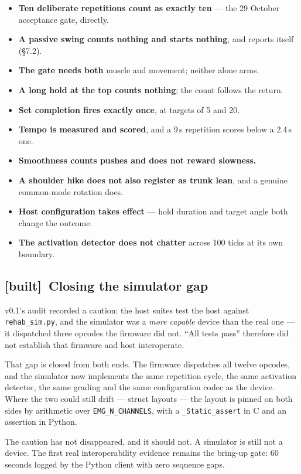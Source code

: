 \documentclass[11pt]{article}
\newcommand{\built}{{\sffamily\scriptsize\color{good}\textbf{[built]}}\ }
\begin{document}
\begin{itemize}
\item \textbf{Ten deliberate repetitions count as exactly ten} --- the
29 October acceptance gate, directly.
\item \textbf{A passive swing counts nothing and starts nothing}, and reports
itself (\S7.2).
\item \textbf{The gate needs both} muscle and movement; neither alone arms.
\item \textbf{A long hold at the top counts nothing}; the count follows the
return.
\item \textbf{Set completion fires exactly once}, at targets of 5 and 20.
\item \textbf{Tempo is measured and scored}, and a 9\,s repetition scores
below a 2.4\,s one.
\item \textbf{Smoothness counts pushes and does not reward slowness.}
\item \textbf{A shoulder hike does not also register as trunk lean}, and a
genuine common-mode rotation does.
\item \textbf{Host configuration takes effect} --- hold duration and target
angle both change the outcome.
\item \textbf{The activation detector does not chatter} across 100 ticks at
its own boundary.
\end{itemize}

\subsection{\built Closing the simulator gap}

\begin{callout}
v0.1's audit recorded a caution: the host suites test the host against
\texttt{rehab\_sim.py}, and the simulator was a \emph{more capable} device
than the real one --- it dispatched three opcodes the firmware did not. ``All
tests pass'' therefore did not establish that firmware and host interoperate.

\medskip
That gap is closed from both ends. The firmware dispatches all twelve opcodes,
and the simulator now implements the same repetition cycle, the same
activation detector, the same grading and the same configuration codec as the
device. Where the two could still drift --- struct layouts --- the layout is
pinned on both sides by arithmetic over \texttt{EMG\_N\_CHANNELS}, with a
\texttt{\_Static\_assert} in C and an assertion in Python.

\medskip
The caution has not disappeared, and it should not. A simulator is still not a
device. The first real interoperability evidence remains the bring-up gate:
60 seconds logged by the Python client with zero sequence gaps.
\end{callout}
\end{document}

